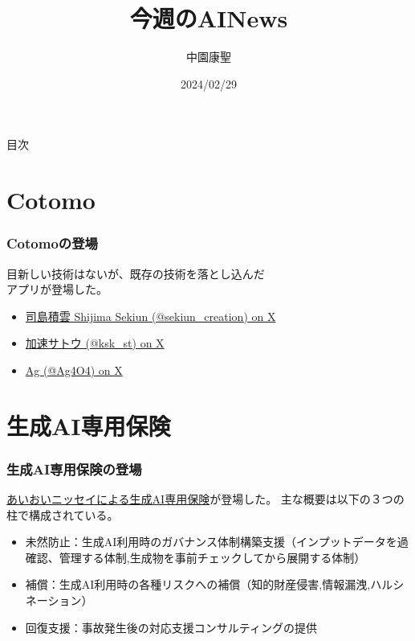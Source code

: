 \documentclass[dvipdfmx,12pt]{beamer}%
\title{今週のAINews}
\author{中園康聖}
\date{2024/02/29}
\begin{document}
\begin{frame}
\titlepage
\end{frame}
\begin{frame}{目次}
\tableofcontents
\end{frame}
\section{Cotomo}
\begin{frame}
\frametitle{Cotomoの登場}
目新しい技術はないが、既存の技術を落とし込んだ\\アプリが登場した。
\begin{itemize}
\item \href{https://x.com/sekiun_creation/status/1761625724358926460?s=12&t=HWsH9aiIPwtM8W1pjX9WBA}{司島積雲 Shijima Sekiun (@sekiun\_creation) on X}
\item \href{https://x.com/ksk_st/status/1761680881943822662?s=12&t=HWsH9aiIPwtM8W1pjX9WBA}{加速サトウ (@ksk\_st) on X}
\item \href{https://x.com/ag4o4/status/1761548559642665299?s=12&t=HWsH9aiIPwtM8W1pjX9WBA}{Ag (@Ag4O4) on X}
\end{itemize}
\end{frame}

\section{生成AI専用保険}
\begin{frame}
\frametitle{生成AI専用保険の登場}
\href{https://www.aioinissaydowa.co.jp/corporate/about/news/pdf/2024/news_2024022701277.pdf}{あいおいニッセイによる生成AI専用保険}が登場した。
主な概要は以下の３つの柱で構成されている。
\begin{itemize}
\item 未然防止：生成AI利用時のガバナンス体制構築支援（インプットデータを過確認、管理する体制,生成物を事前チェックしてから展開する体制）
\item 補償：生成AI利用時の各種リスクへの補償（知的財産侵害,情報漏洩,ハルシネーション）
\item 回復支援：事故発生後の対応支援コンサルティングの提供
\end{itemize}
\end{frame}
\end{document}
